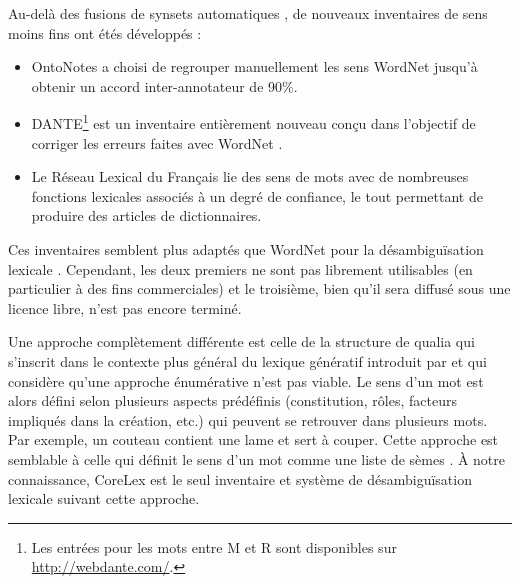 Au-delà des fusions de synsets automatiques \citep{snow2007learning}, de
nouveaux inventaires de sens moins fins ont étés développés :

\begin{itemize}

    \item OntoNotes \citep{hovy2006ontonotes} a choisi de regrouper
        manuellement les sens WordNet jusqu'à obtenir un accord
        inter-annotateur de 90\%.

    \item DANTE\footnote{Les entrées pour les mots entre M et R sont
        disponibles sur \url{http://webdante.com/}.} \citep{mccarthy2010dante} est un
        inventaire entièrement nouveau conçu dans l'objectif de corriger les
        erreurs faites avec WordNet \citep{kilgarriff2010detailed}.

    \item Le Réseau Lexical du Français \citep{gader2014lexicon} lie des sens de
        mots avec de nombreuses fonctions lexicales associés à un degré de
        confiance, le tout permettant de produire des articles de dictionnaires.

\end{itemize}

Ces inventaires semblent plus adaptés que WordNet pour la désambiguïsation
lexicale \citep{navigli2012quick}. Cependant, les deux premiers ne sont pas
librement utilisables (en particulier à des fins commerciales) et le troisième,
bien qu'il sera diffusé sous une licence libre, n'est pas encore terminé.

Une approche complètement différente est celle de la structure de qualia
\citep{johnston1996qualia} qui s'inscrit dans le contexte plus général du
lexique génératif introduit par \cite{pustejovsky1991generative} et qui
considère qu'une approche énumérative n'est pas viable. Le sens d'un mot est
alors défini selon plusieurs aspects prédéfinis (constitution, rôles, facteurs
impliqués dans la création, etc.) qui peuvent se retrouver dans plusieurs mots.
Par exemple, un couteau contient une lame et sert à couper. Cette approche est
semblable à celle qui définit le sens d'un mot comme une liste de sèmes
\citep{rastier1987semantique}. À notre connaissance, CoreLex
\citep{buitelaar1998corelex} est le seul inventaire et système de
désambiguïsation lexicale suivant cette approche.

